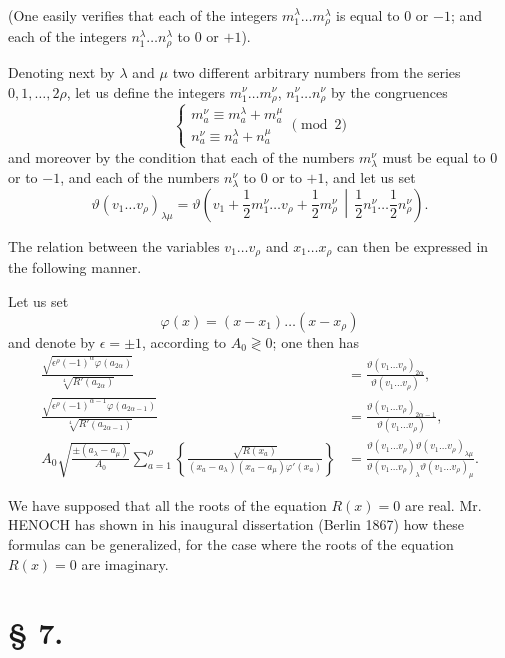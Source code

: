 \documentclass{article}
\begin{document}
(One easily verifies that each of the integers $m^{\lambda}_{1}\ldots m^{\lambda}_{\rho}$ is equal to 0 or $-1$; and each of the integers $n^{\lambda}_{1}\ldots n^{\lambda}_{\rho}$ to 0 or $+1$).

Denoting next by $\lambda$ and $\mu$ two different arbitrary numbers from the series $0, 1, \ldots, 2\rho$, let us define the integers $m_1^\nu\ldots m_\rho^\nu$, $n_1^\nu\ldots n_\rho^\nu$ by the congruences
\[
\begin{cases}
m_a^\nu \equiv m_a^\lambda + m_a^\mu \\
n_a^\nu \equiv n_a^\lambda + n_a^\mu
\end{cases} \pmod{2}
\]
and moreover by the condition that each of the numbers $m_\lambda^\nu$ must be equal to 0 or to $-1$, and each of the numbers $n_\lambda^\nu$ to 0 or to $+1$, and let us set
\[
\vartheta(v_1\ldots v_\rho)_{\lambda\mu} = \vartheta\left(v_1 + \frac{1}{2}m_1^\nu\ldots v_\rho + \frac{1}{2}m_\rho^\nu \,\middle|\, \frac{1}{2}n_1^\nu\ldots \frac{1}{2}n_\rho^\nu\right).
\]

The relation between the variables $v_1\ldots v_\rho$ and $x_1\ldots x_\rho$ can then be expressed in the following manner.

Let us set
\[
\varphi(x) = (x - x_1)\ldots(x - x_\rho)
\]
and denote by $\epsilon = \pm 1$, according to $A_0 \gtrless 0$; one then has
\begin{align*}
\frac{\sqrt{\epsilon^{\rho}(-1)^{\alpha}\varphi(a_{2\alpha})}}{\sqrt[4]{R'(a_{2\alpha})}} &= \frac{\vartheta(v_1\ldots v_\rho)_{2\alpha}}{\vartheta(v_1\ldots v_\rho)}, \\
\frac{\sqrt{\epsilon^{\rho}(-1)^{\alpha-1}\varphi(a_{2\alpha-1})}}{\sqrt[4]{R'(a_{2\alpha-1})}} &= \frac{\vartheta(v_1\ldots v_\rho)_{2\alpha-1}}{\vartheta(v_1\ldots v_\rho)}, \\
A_0\sqrt{\frac{\pm(a_\lambda - a_\mu)}{A_0}}\sum_{a=1}^{\rho}\left\{\frac{\sqrt{R(x_a)}}{(x_a - a_\lambda)(x_a - a_\mu)\varphi'(x_a)}\right\} &= \frac{\vartheta(v_1\ldots v_\rho)\vartheta(v_1\ldots v_\rho)_{\lambda\mu}}{\vartheta(v_1\ldots v_\rho)_\lambda\vartheta(v_1\ldots v_\rho)_\mu}.
\end{align*}

We have supposed that all the roots of the equation $R(x) = 0$ are real. Mr. HENOCH has shown in his inaugural dissertation (Berlin 1867) how these formulas can be generalized, for the case where the roots of the equation $R(x) = 0$ are imaginary.


\section*{§ 7.}
\setcounter{equation}{0}
\end{document}
